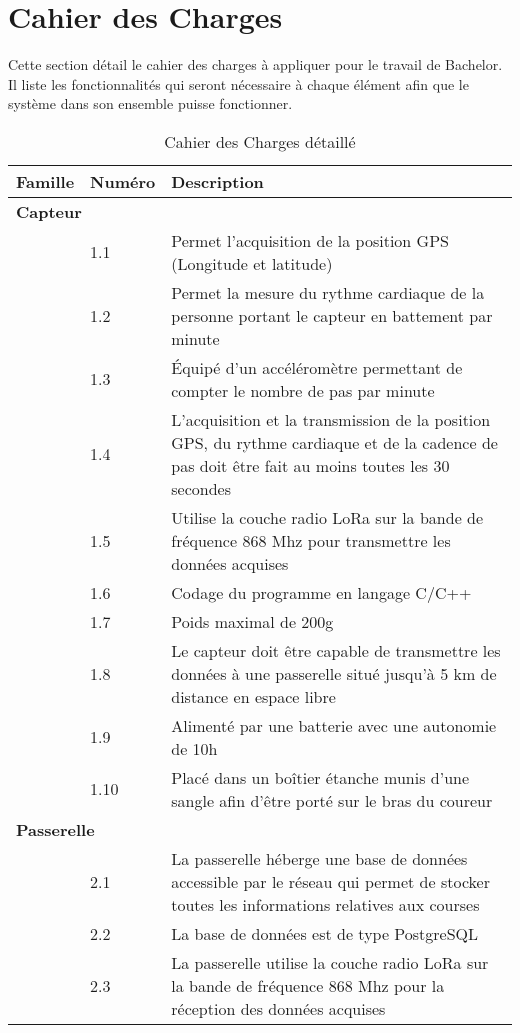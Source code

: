 \chapter{Cahier des Charges}

Cette section détail le cahier des charges à appliquer pour le travail de Bachelor. Il liste les fonctionnalités qui seront nécessaire à chaque élément afin que le système dans son ensemble puisse fonctionner.

\begin{longtable}{llp{10cm}}
\caption[Cahier des Charges détaillé]{Cahier des Charges détaillé} \\
\toprule
Famille & Numéro & Description \\
\midrule
\multicolumn{2}{l}{\textbf{Capteur}} \\
 & 1.1 & Permet l’acquisition de la position GPS (Longitude et latitude) \\
 & 1.2 & Permet la mesure du rythme cardiaque de la personne portant le capteur en battement par minute\\
 & 1.3 & Équipé d’un accéléromètre permettant de compter le nombre de pas par minute \\
 & 1.4 & L’acquisition et la transmission de la position GPS, du rythme cardiaque et de la cadence de pas doit être fait au moins toutes les 30 secondes \\
 & 1.5 & Utilise la couche radio LoRa sur la bande de fréquence 868 Mhz pour transmettre les données acquises \\
 & 1.6 & Codage du programme en langage C/C++ \\
 & 1.7 & Poids maximal de 200g \\
 & 1.8 & Le capteur doit être capable de transmettre les données à une passerelle situé jusqu’à 5 km de distance en espace libre \\
 & 1.9 & Alimenté par une batterie avec une autonomie de 10h \\
 & 1.10 & Placé dans un boîtier étanche munis d’une sangle afin d’être porté sur le bras du coureur \\
\bottomrule
\multicolumn{2}{l}{\textbf{Passerelle}} \\
 & 2.1 & La passerelle héberge une base de données accessible par le réseau qui permet de stocker toutes les informations relatives aux courses \\
 & 2.2 & La base de données est de type PostgreSQL \\
 & 2.3 & La passerelle utilise la couche radio LoRa sur la bande de fréquence 868 Mhz pour la réception des données acquises \\

\end{longtable}
